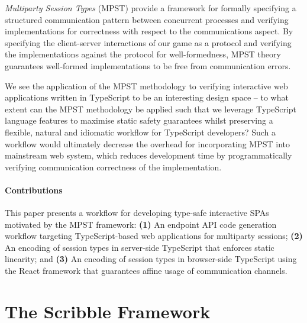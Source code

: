 \documentclass[submission,copyright,creativecommons]{eptcs}
\newcommand{\sectionref}[1]{\textsection~\ref{#1}}
\begin{document}
\textit{Multiparty Session Types} (MPST) \cite{MPST} provide a framework for formally specifying a structured communication pattern between concurrent processes and verifying implementations for correctness with respect to the communications aspect. By specifying the client-server interactions of our game as a protocol and verifying the implementations against the protocol for well-formedness, MPST theory guarantees well-formed implementations to be free from communication errors.

We see the application of the MPST methodology to verifying
interactive web applications written in TypeScript to be an
interesting design space -- to what extent can the MPST methodology be
applied such that we leverage TypeScript language features to maximise
static safety guarantees whilst preserving a flexible, natural and
idiomatic workflow for TypeScript developers? Such a workflow would
ultimately decrease the overhead for incorporating MPST into
mainstream web system, which reduces development time by
programmatically
verifying communication correctness of the implementation. 

\paragraph{Contributions}
This paper presents a workflow for developing type-safe interactive SPAs motivated by the MPST framework: \textbf{(1)} An endpoint API code generation workflow targeting TypeScript-based web applications for multiparty sessions; \textbf{(2)} An encoding of session types in server-side TypeScript that enforces static linearity; and \textbf{(3)} An encoding of session types in browser-side TypeScript using the React framework that guarantees affine usage of communication channels.


\section{The Scribble Framework}
\label{section:scribble}
\end{document}
